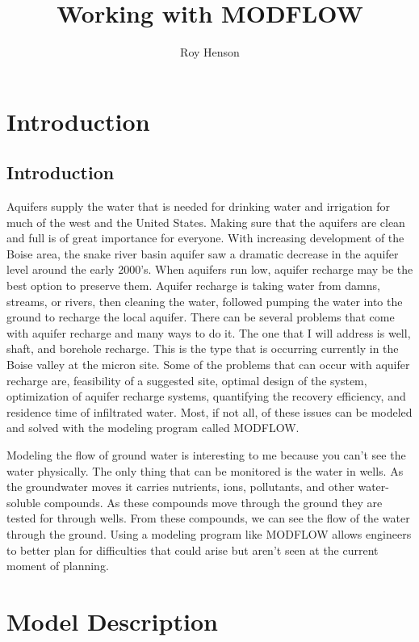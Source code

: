\documentclass[]{report}
\title{Working with MODFLOW}
\author{Roy Henson}
\begin{document}
\maketitle

\tableofcontents

\chapter{Introduction}
\section{Introduction}
Aquifers supply the water that is needed for drinking water and irrigation for much of the west and the United States. Making sure that the aquifers are clean and full is of great importance for everyone. With increasing development of the Boise area, the snake river basin aquifer saw a dramatic decrease in the aquifer level around the early 2000’s. When aquifers run low, aquifer recharge may be the best option to preserve them.
Aquifer recharge is taking water from damns, streams, or rivers, then cleaning the water, followed pumping the water into the ground to recharge the local aquifer. There can be several problems that come with aquifer recharge and many ways to do it. The one that I will address is well, shaft, and borehole recharge. This is the type that is occurring currently in the Boise valley at the micron site. Some of the problems that can occur with aquifer recharge are, feasibility of a suggested site, optimal design of the system, optimization of aquifer recharge systems, quantifying the recovery efficiency, and residence time of infiltrated water. Most, if not all, of these issues can be modeled and solved with the modeling program called MODFLOW.

Modeling the flow of ground water is interesting to me because you can’t see the water physically. The only thing that can be monitored is the water in wells. As the groundwater moves it carries nutrients, ions, pollutants, and other water-soluble compounds. As these compounds move through the ground they are tested for through wells. From these compounds, we can see the flow of the water through the ground. Using a modeling program like MODFLOW allows engineers to better plan for difficulties that could arise but aren’t seen at the current moment of planning.

\chapter{Model Description}
\end{document}
